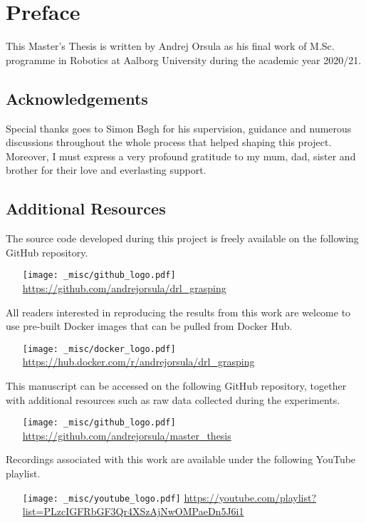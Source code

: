 \chapter*{Preface}

This Master’s Thesis is written by Andrej Orsula as his final work of M.Sc. programme in Robotics at Aalborg University during the academic year 2020/21.


\section*{Acknowledgements}

Special thanks goes to Simon Bøgh for his supervision, guidance and numerous discussions throughout the whole process that helped shaping this project.
Moreover, I must express a very profound gratitude to my mum, dad, sister and brother for their love and everlasting support.


\section*{Additional Resources}

\noindent
The source code developed during this project is freely available on the following GitHub repository.
\begin{itemize}
    \item[{\texttt{[image: \_misc/github\_logo.pdf]}}] \href{https://github.com/andrejorsula/drl_grasping}{https://github.com/andrejorsula/drl\_grasping}
\end{itemize}

\noindent
All readers interested in reproducing the results from this work are welcome to use pre-built Docker images that can be pulled from Docker Hub.
\begin{itemize}
    \item[{\texttt{[image: \_misc/docker\_logo.pdf]}}] \href{https://hub.docker.com/r/andrejorsula/drl_grasping}{https://hub.docker.com/r/andrejorsula/drl\_grasping}
\end{itemize}

\noindent
This manuscript can be accessed on the following GitHub repository, together with additional resources such as raw data collected during the experiments.
\begin{itemize}
    \item[{\texttt{[image: \_misc/github\_logo.pdf]}}] \href{https://github.com/andrejorsula/master_thesis}{https://github.com/andrejorsula/master\_thesis}
\end{itemize}

\noindent
Recordings associated with this work are available under the following YouTube playlist.
\begin{itemize}
    \item[{\texttt{[image: \_misc/youtube\_logo.pdf]}}] \href{https://youtube.com/playlist?list=PLzcIGFRbGF3Qr4XSzAjNwOMPaeDn5J6i1}{https://youtube.com/playlist?list=PLzcIGFRbGF3Qr4XSzAjNwOMPaeDn5J6i1}
\end{itemize}
